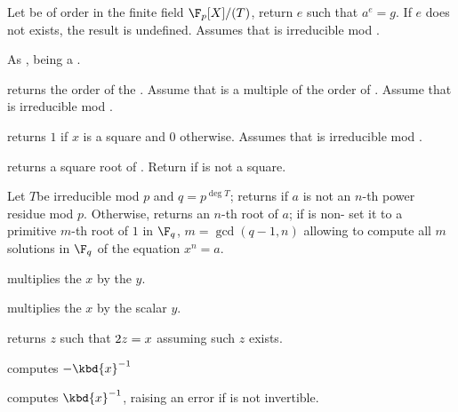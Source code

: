  Let  be of
order  in the finite field $\F_p[X]/(T)$, return $e$ such that
$a^e=g$. If $e$ does not exists, the result is undefined. Assumes
that  is irreducible mod .

 As
,  being a .

 returns the order of the
 . Assume that  is a multiple of the order of
. Assume that  is irreducible mod .

 returns $1$ if $x$ is a square
and $0$ otherwise. Assumes that  is irreducible mod .

 returns a square root of .
Return  if  is not a square.

Let $T$be irreducible mod $p$ and $q = p^{\deg T}$; returns  if $a$
is not an $n$-th power residue mod $p$. Otherwise, returns an $n$-th root of
$a$; if  is non- set it to a primitive $m$-th root of $1$
in $\F_q$, $m = \gcd(q-1,n)$ allowing to compute all $m$ solutions in $\F_q$
of the equation $x^n = a$.





 multiplies the  $x$
by the  $y$.

 multiplies the  $x$
by the scalar $y$.

 returns $z$ such that $2\*z = x$
assuming such $z$ exists.



 computes $-\kbd{x}^{-1}$

 computes $\kbd{x}^{-1}$, raising an
error if  is not invertible.

